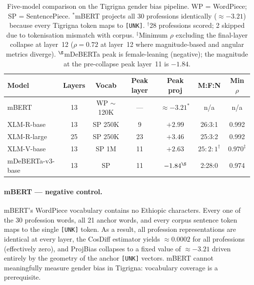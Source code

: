 \documentclass[11pt,a4paper]{article}
\begin{document}
\begin{table}[h]
\centering
\small
\begin{tabular}{lcccccc}
\toprule
\textbf{Model} & \textbf{Layers} & \textbf{Vocab} & \textbf{Peak layer} & \textbf{Peak proj} & \textbf{M:F:N} & \textbf{Min $\rho$} \\
\midrule
mBERT              & 13 & WP $\sim$120K & ---  & $\approx -3.21^{*}$ & n/a     & n/a \\
XLM-R-base         & 13 & SP 250K       & 9    & $+2.99$             & 26:3:1  & 0.992 \\
XLM-R-large        & 25 & SP 250K       & 23   & $+3.46$             & 25:3:2  & 0.992 \\
XLM-V-base         & 13 & SP 1M         & 11   & $+2.63$             & $25:2:1^{\dagger}$ & $0.970^{\ddagger}$ \\
mDeBERTa-v3-base   & 13 & SP            & 11   & $-1.84^{\S}$        & 2:28:0  & 0.974 \\
\bottomrule
\end{tabular}
\caption{Five-model comparison on the Tigrigna gender bias pipeline.
WP = WordPiece; SP = SentencePiece.
$^{*}$mBERT projects all 30 professions identically ($\approx -3.21$) because
every Tigrigna token maps to \texttt{[UNK]}.
$^{\dagger}$28 professions scored; 2 skipped due to tokenisation mismatch with corpus.
$^{\ddagger}$Minimum $\rho$ excluding the final-layer collapse at layer~12
($\rho = 0.72$ at layer~12 where magnitude-based and angular metrics diverge).
$^{\S}$mDeBERTa peak is female-leaning (negative); the magnitude at the
pre-collapse peak layer~11 is $-1.84$.}
\label{tab:model_compare}
\end{table}

\paragraph{mBERT — negative control.}
mBERT's WordPiece vocabulary contains no Ethiopic characters. Every one of the
30 profession words, all 21 anchor words, and every corpus sentence token maps
to the single \texttt{[UNK]} token. As a result, all profession representations
are identical at every layer, the CosDiff estimator yields $\approx 0.0002$ for
all professions (effectively zero), and ProjBias collapses to a fixed value of
$\approx -3.21$ driven entirely by the geometry of the anchor
\texttt{[UNK]} vectors. mBERT cannot meaningfully measure gender bias in
Tigrigna: vocabulary coverage is a prerequisite.
\end{document}
